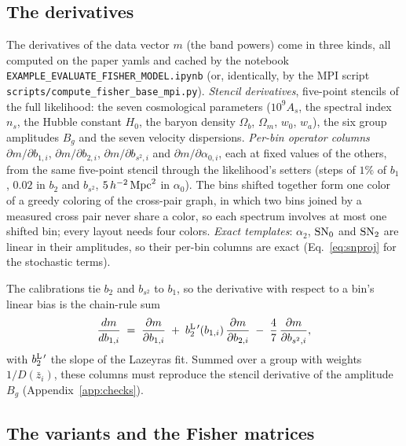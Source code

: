 \documentclass[11pt]{article}
\newcommand{\bstwo}{b_{s^2}}
\newcommand{\aunit}{\,h^{-2}\,{\rm Mpc}^2}
\newcommand{\SNz}{{\rm SN}_0}
\newcommand{\SNt}{{\rm SN}_2}
\begin{document}
\subsection{The derivatives}
\label{sec:derivs}

The derivatives of the data vector $m$ (the band powers) come in three
kinds, all computed on the paper yamls and cached by the notebook
\texttt{EXAMPLE\_EVALUATE\_FISHER\_MODEL.ipynb} (or, identically, by
the MPI script \texttt{scripts/compute\_fisher\_base\_mpi.py}).
\emph{Stencil derivatives}, five-point stencils of the full
likelihood: the seven cosmological parameters ($10^9 A_s$, the
spectral index $n_s$, the Hubble constant $H_0$, the baryon density
$\Omega_b$, $\Omega_m$, $w_0$, $w_a$), the six group amplitudes $B_g$
and the seven velocity dispersions.  \emph{Per-bin operator columns}
$\partial m/\partial b_{1,i}$, $\partial m/\partial b_{2,i}$,
$\partial m/\partial b_{s^2,i}$ and $\partial m/\partial \alpha_{0,i}$,
each at fixed values of the others, from the same five-point stencil
through the likelihood's setters (steps of $1\%$ of $b_1$, $0.02$ in
$b_2$ and $\bstwo$, $5\aunit$ in $\alpha_0$).  The bins shifted
together form one color of a greedy coloring of the cross-pair graph,
in which two bins joined by a measured cross pair never share a color,
so each spectrum involves at most one shifted bin; every layout needs
four colors.  \emph{Exact templates}: $\alpha_2$, $\SNz$ and $\SNt$
are linear in their amplitudes, so their per-bin columns are exact
(Eq.~\eqref{eq:snproj} for the stochastic terms).

The calibrations tie $b_2$ and $\bstwo$ to $b_1$, so the derivative
with respect to a bin's linear bias is the chain-rule sum
\begin{equation}
  \frac{dm}{db_{1,i}}
  \;=\; \frac{\partial m}{\partial b_{1,i}}
  \;+\; b_2^{\rm L\,\prime}(b_{1,i})\,\frac{\partial m}{\partial b_{2,i}}
  \;-\; \frac{4}{7}\,\frac{\partial m}{\partial b_{s^2,i}} ,
  \label{eq:chain}
\end{equation}
with $b_2^{\rm L\,\prime}$ the slope of the Lazeyras fit.  Summed over
a group with weights $1/D(\bar{z}_i)$, these columns must reproduce the
stencil derivative of the amplitude $B_g$ (Appendix~\ref{app:checks}).

\subsection{The variants and the Fisher matrices}
\label{sec:variants}
\end{document}
